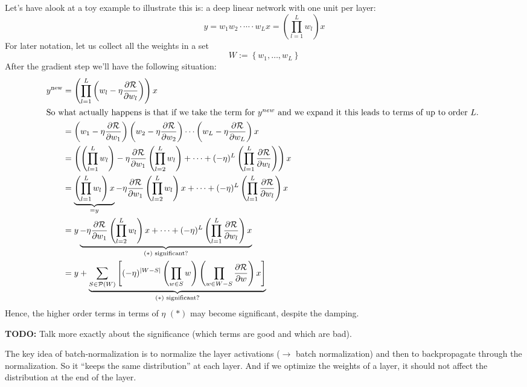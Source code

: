 \documentclass[a2paper,8pt]{extarticle}
\newcommand{\cP}{\mathcal{P}}
\newcommand{\cR}{\mathcal{R}}
\newcommand{\set}[1]{\left\{ #1 \right\}}
\newcommand{\card}[1]{\left\lvert #1 \right\rvert}
\renewcommand{\setminus}{-}
\newcommand{\todo}[1]{\textbf{TODO:} #1}
\newcommand{\todo}[1]{%
}
\newcommand{\ssep}{\hdashrule[1.1ex]{\linewidth}{0.1pt}{0.3mm}\vspace{-6pt}}
\newcommand{\ssep}{\hdashrule[1.1ex]{\linewidth}{0.1pt}{0.3mm}\vspace{-3pt}}
\begin{document}
\begin{landscape}
\begin{multicols*}{7}
Let's have  alook at a toy example to illustrate this is: a deep linear network
with one unit per layer:
\[
y=w_1w_2\cdot\cdots\cdot w_L x=\left(\prod_{l=1}^L w_l\right)x
\]
For later notation, let us collect all the weights in a set
\[
W:=\set{w_1,\ldots,w_L}
\]
After the gradient step we'll have the following situation:
\begin{gather*}
\begin{align*}
y^{\text{new}}
&=
\left(
\prod_{l=1}^L 
\left(
w_l-\eta\frac{\partial \cR}{\partial w_l}
\right)
\right)x
\\
\intertext{So what actually happens is that if we take the term 
for $y^{new}$ and we expand it this leads to terms of up to order $L$.
} 
&=
\left(
w_1-\eta\frac{\partial \cR}{\partial w_1}
\right)
\left(
w_2-\eta\frac{\partial \cR}{\partial w_2}
\right)
\cdots
\left(
w_L-\eta\frac{\partial \cR}{\partial w_L}
\right)
x
\\
&=
\left(
\left(\prod_{l=1}^L w_l\right)
-\eta\frac{\partial \cR}{\partial w_1}
\left(\prod_{l=2}^L w_l\right)
+\cdots+
(-\eta)^L
\left(\prod_{l=1}^L \frac{\partial \cR}{\partial w_l}\right)
\right)
x
\\
&=
\underbrace{\left(\prod_{l=1}^L w_l\right)x}_{=y}
-\eta\frac{\partial \cR}{\partial w_1}
\left(\prod_{l=2}^L w_l\right)x
+\cdots+
(-\eta)^L
\left(\prod_{l=1}^L \frac{\partial \cR}{\partial w_l}\right)x
\\
&=
y
\underbrace{-\eta\frac{\partial \cR}{\partial w_1}
\left(\prod_{l=2}^L w_l\right)x
+\cdots+
(-\eta)^L
\left(\prod_{l=1}^L \frac{\partial \cR}{\partial w_l}\right)x
}_{(*) \text{ significant?}}
\\
&=
y+
\underbrace{\sum_{S\in\cP(W)}
\left[
(-\eta)^{\card{W\setminus S}}
\left(\prod_{w\in S}w\right)
\left(\prod_{w\in W\setminus S}
\frac{\partial \cR}{\partial w}\right)x
\right]}_{(*)\text{ significant?}}
\end{align*}
\end{gather*}
Hence, the higher order terms in terms of $\eta$ $(*)$ may become significant,
despite the damping.

\ssep

\todo{Talk more exactly about the significance (which terms are good and which
are bad).}

\ssep

The key idea of batch-normalization is to normalize the layer activations
($\to$ batch normalization) and then to backpropagate through the normalization.
So it ``keeps the same distribution'' at each layer. And if we optimize the
weights of a layer, it should not affect the distribution at the end of the
layer.


\end{multicols*}
\end{landscape}
\end{document}
